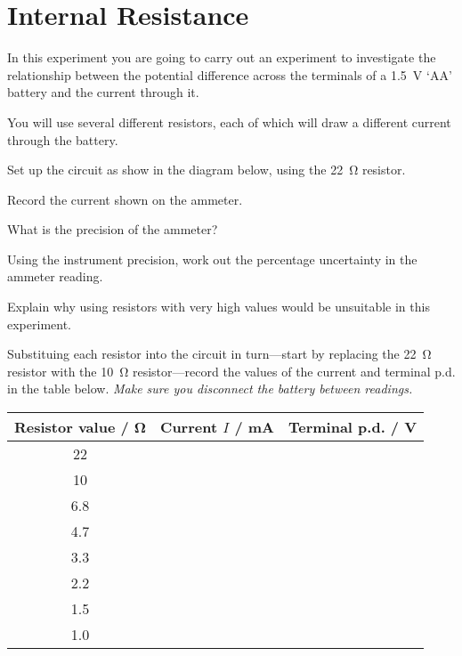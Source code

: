\section{Internal Resistance}
\label{intres}

In this experiment you are going to carry out an experiment to investigate the relationship between the potential difference across the terminals of a \SI{1.5}{V} `AA' battery and the current through it.

You will use several different resistors, each of which will draw a different current through the battery.

\begin{questions}
\question Set up the circuit as show in the diagram below, using the \SI{22}{\ohm} resistor.
\begin{center}
\end{center}

\question Record the current shown on the ammeter. \answerline

\question What is the precision of the ammeter? \answerline

\question Using the instrument precision, work out the percentage uncertainty in the ammeter reading.
\fillwithlines{2cm}

\question Explain why using resistors with very high values would be unsuitable in this experiment.
\fillwithlines{3cm}

\newpage

\question Substituing each resistor into the circuit in turn---start by replacing the \SI{22}{\ohm} resistor with the \SI{10}{\ohm} resistor---record the values of the current and terminal p.d. in the table below.  \emph{Make sure you disconnect the battery between readings.}

\begin{center}
\begin{tabular}{|c|c|c|}
\hline
Resistor value / \si{\ohm} & Current $I$ / mA & Terminal p.d. / V\\
\hline 
22 & & \\
\hline
10 & & \\
\hline
6.8 & & \\
\hline
4.7 & & \\
\hline
3.3 & & \\
\hline
2.2 & & \\
\hline
1.5 & & \\
\hline
1.0 & & \\
\hline
\end{tabular}
\end{center}


\end{questions}
